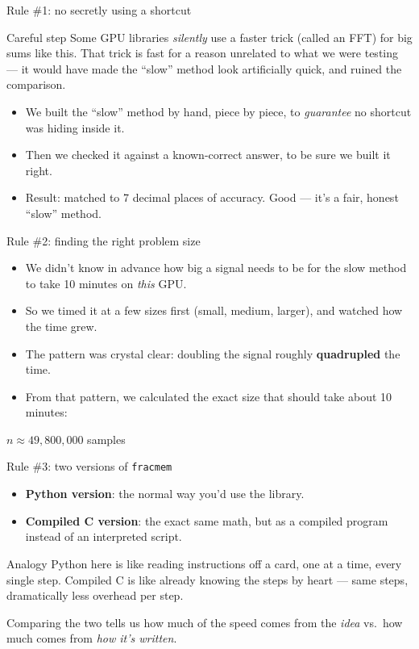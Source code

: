 \documentclass[11pt]{beamer}
\begin{document}
\begin{frame}{Rule \#1: no secretly using a shortcut}
\begin{alertblock}{Careful step}
Some GPU libraries \emph{silently} use a faster trick (called an FFT) for big sums like this. That trick is fast for a reason unrelated to what we were testing --- it would have made the ``slow'' method look artificially quick, and ruined the comparison.
\end{alertblock}
\begin{itemize}
\item We built the ``slow'' method by hand, piece by piece, to \emph{guarantee} no shortcut was hiding inside it.
\item Then we checked it against a known-correct answer, to be sure we built it right.
\item Result: matched to 7 decimal places of accuracy. Good --- it's a fair, honest ``slow'' method.
\end{itemize}
\end{frame}

\begin{frame}{Rule \#2: finding the right problem size}
\begin{itemize}
\item We didn't know in advance how big a signal needs to be for the slow method to take 10 minutes on \emph{this} GPU.
\item So we timed it at a few sizes first (small, medium, larger), and watched how the time grew.
\item The pattern was crystal clear: doubling the signal roughly \textbf{quadrupled} the time.
\item From that pattern, we calculated the exact size that should take about 10 minutes:
\end{itemize}
\begin{block}{}
\centering \Large $n \approx 49{,}800{,}000$ samples
\end{block}
\end{frame}

\begin{frame}{Rule \#3: two versions of \texttt{fracmem}}
\begin{itemize}
\item \textbf{Python version}: the normal way you'd use the library.
\item \textbf{Compiled C version}: the exact same math, but as a compiled program instead of an interpreted script.
\end{itemize}
\begin{exampleblock}{Analogy}
Python here is like reading instructions off a card, one at a time, every single step. Compiled C is like already knowing the steps by heart --- same steps, dramatically less overhead per step.
\end{exampleblock}
Comparing the two tells us how much of the speed comes from the \emph{idea} vs.\ how much comes from \emph{how it's written}.
\end{frame}
\end{document}
